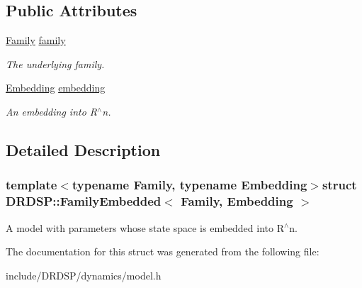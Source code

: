 \subsection*{Public Attributes}
\begin{DoxyCompactItemize}
\item 
\hypertarget{struct_d_r_d_s_p_1_1_family_embedded_ad5b617f51f00bbcaa9a73165852c7480}{\hyperlink{struct_d_r_d_s_p_1_1_family}{Family} \hyperlink{struct_d_r_d_s_p_1_1_family_embedded_ad5b617f51f00bbcaa9a73165852c7480}{family}}\label{struct_d_r_d_s_p_1_1_family_embedded_ad5b617f51f00bbcaa9a73165852c7480}

\begin{DoxyCompactList}\small\item\em The underlying family. \end{DoxyCompactList}\item 
\hypertarget{struct_d_r_d_s_p_1_1_family_embedded_a68868f5c7f8152861cb4d0056a8f4418}{\hyperlink{struct_d_r_d_s_p_1_1_embedding}{Embedding} \hyperlink{struct_d_r_d_s_p_1_1_family_embedded_a68868f5c7f8152861cb4d0056a8f4418}{embedding}}\label{struct_d_r_d_s_p_1_1_family_embedded_a68868f5c7f8152861cb4d0056a8f4418}

\begin{DoxyCompactList}\small\item\em An embedding into R$^\wedge$n. \end{DoxyCompactList}\end{DoxyCompactItemize}


\subsection{Detailed Description}
\subsubsection*{template$<$typename Family, typename Embedding$>$struct D\-R\-D\-S\-P\-::\-Family\-Embedded$<$ Family, Embedding $>$}

A model with parameters whose state space is embedded into R$^\wedge$n. 

The documentation for this struct was generated from the following file\-:\begin{DoxyCompactItemize}
\item 
include/\-D\-R\-D\-S\-P/dynamics/model.\-h\end{DoxyCompactItemize}
